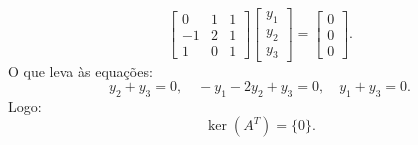 \begin{resolution}
\begin{enumerate}[label=\alph*)]
          \[
            \begin{bmatrix}
              0  & 1 & 1 \\
              -1 & 2 & 1 \\
              1  & 0 & 1
            \end{bmatrix}
            \begin{bmatrix}
              y_1 \\ y_2 \\ y_3
            \end{bmatrix} =
            \begin{bmatrix}
              0 \\ 0 \\ 0
            \end{bmatrix}.
          \]
          O que leva às equações:
          \[
            y_2 + y_3 = 0, \quad - y_1 - 2 y_2 + y_3 = 0, \quad y_1 + y_3 = 0.
          \]
          Logo:
          \[
            \operatorname{ker}(A^T) = \{0\}.
          \]


\end{enumerate}
\end{resolution}
